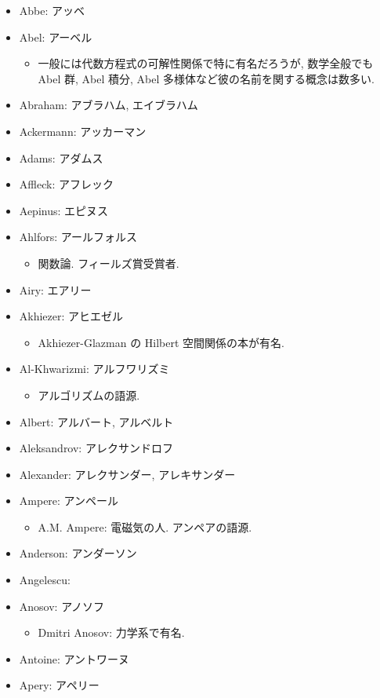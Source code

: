 \documentclass[openany, a4paper, oneside]{jsbook}
\begin{document}
\begin{itemize}
\item Abbe: アッベ
\item Abel: アーベル
\begin{itemize}
\item 一般には代数方程式の可解性関係で特に有名だろうが, 数学全般でも Abel 群, Abel 積分, Abel 多様体など彼の名前を関する概念は数多い.
\end{itemize}
\item Abraham: アブラハム, エイブラハム
\item Ackermann: アッカーマン
\item Adams: アダムス
\item Affleck: アフレック
\item Aepinus: エピヌス
\item Ahlfors: アールフォルス
\begin{itemize}
\item 関数論. フィールズ賞受賞者.
\end{itemize}
\item Airy: エアリー
\item Akhiezer: アヒエゼル
\begin{itemize}
\item Akhiezer-Glazman の Hilbert 空間関係の本が有名.
\end{itemize}
\item Al-Khwarizmi: アルフワリズミ
\begin{itemize}
\item アルゴリズムの語源.
\end{itemize}
\item Albert: アルバート, アルベルト
\item Aleksandrov: アレクサンドロフ
\item Alexander: アレクサンダー, アレキサンダー
\item Ampere: アンペール
\begin{itemize}
\item A.M. Ampere: 電磁気の人. アンペアの語源.
\end{itemize}
\item Anderson: アンダーソン
\item Angelescu:
\item Anosov: アノソフ
\begin{itemize}
\item Dmitri Anosov: 力学系で有名.
\end{itemize}
\item Antoine: アントワーヌ
\item Apery: アペリー

\end{itemize}
\end{document}
